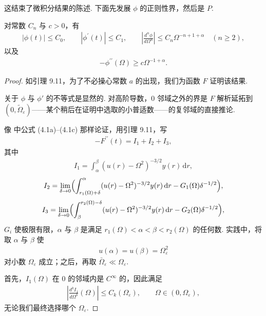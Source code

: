 这结束了微积分结果的陈述. 下面先发展 $\phi$ 的正则性界，然后是 $P$.

\begin{lemma}\label{lem:9.15}
对常数 $C_{n}$ 与 $c > 0$，有
\begin{align*}
  |\phi(t)|\leq C_{0},\qquad |\phi^{\prime}(t)|\leq C_{1},\qquad
  \left|\frac{d^{n}\phi}{d\Omega^{n}}\right|\leq C_{n}\Omega^{-n+1+\alpha}\quad (n\geq 2),
\end{align*}
以及
\begin{align*}
  -\phi^{\prime\prime}(\Omega)\geq c\Omega^{-1+\alpha}.
\end{align*}
\end{lemma}

\begin{proof}
如引理 9.11，为了不必操心常数 $a$ 的出现，我们为函数 $F$ 证明该结果.

关于 $\phi$ 与 $\phi'$ 的不等式是显然的. 对高阶导数，$0$ 邻域之外的界是 $F$ 解析延拓到 $(0, \tilde{\Omega}_{\varepsilon})$——某个稍后在证明中选取的小普适数——的复邻域的直接推论.

像 \cite{b208} 中公式 (4.1a)--(4.1c) 那样论证，用引理 9.11，写
\begin{align*}
  -F^{\prime\prime}(t)=I_{1}+I_{2}+I_{3},
\end{align*}
其中
\begin{align*}
  I_{1}=\int_{\alpha}^{\beta}(u(r)-\Omega^{2})^{-3/2}y(r)\,\mathrm{d}r,
\end{align*}
\begin{align*}
  I_{2}=\lim_{\delta\rightarrow 0}\Bigl(\int_{r_{1}(\Omega)+\delta}^{\alpha}
  (u(r)-\Omega^{2})^{-3/2}y(r)\,\mathrm{d}r-G_{1}(\Omega)\delta^{-1/2}\Bigr),
\end{align*}
\begin{align*}
  I_{3}=\lim_{\delta\rightarrow 0}\Bigl(\int_{\beta}^{r_{2}(\Omega)-\delta}
  (u(r)-\Omega^{2})^{-3/2}y(r)\,\mathrm{d}r-G_{2}(\Omega)\delta^{-1/2}\Bigr),
\end{align*}
$G_i$ 使极限有限，$\alpha$ 与 $\beta$ 是满足 $r_1(\Omega) < \alpha < \beta < r_2(\Omega)$ 的任何数. 实践中，将取 $\alpha$ 与 $\beta$ 使
\begin{align*}
  u(\alpha)=u(\beta)=\Omega_{\varepsilon}^{2}
\end{align*}
对小数 $\Omega_{\varepsilon}$ 成立；之后，再取 $\bar{\Omega}_{\varepsilon} \ll \Omega_{\varepsilon}$.

首先，$I_{1}(\Omega)$ 在 $0$ 的邻域内是 $C^{\infty}$ 的，因此满足
\begin{align*}
  \left|\frac{d^{k}I_{1}}{d\Omega^{k}}(\Omega)\right|\leq C_{k}(\Omega_{\varepsilon}),\qquad \Omega\in(0,\Omega_{\varepsilon}),
\end{align*}
无论我们最终选择哪个 $\Omega_{\varepsilon}$.


\end{proof}
